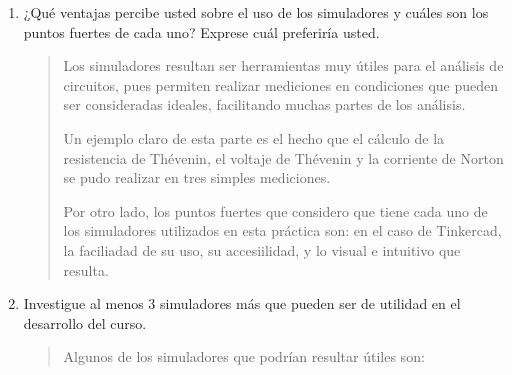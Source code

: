 \documentclass{article}
\begin{document}
\begin{enumerate}[label=\alph*.-]
        \begin{quote}
            Sí, tanto el teorema de Thévenin como el de Norton han quedado comprobados a través de los montajes. Un ejemplo claro de esto es durante el paso 12 y 13, en donde se pudo comprobar la equivalencia de ambos equivalentes para obtener la potencia, obteniendo en ambos casos exactamente el mismo valor, valor muy cercano al valor obtenido durante el paso 12.
        \end{quote}

        \item ¿Qué ventajas percibe usted sobre el uso de los simuladores y cuáles son los puntos fuertes de cada uno? Exprese cuál preferiría usted.
        
        \begin{quote}
            Los simuladores resultan ser herramientas muy útiles para el análisis de circuitos, pues permiten realizar mediciones en condiciones que pueden ser consideradas ideales, facilitando muchas partes de los análisis.

            Un ejemplo claro de esta parte es el hecho que el cálculo de la resistencia de Thévenin, el voltaje de Thévenin y la corriente de Norton se pudo realizar en tres simples mediciones.

            Por otro lado, los puntos fuertes que considero que tiene cada uno de los simuladores utilizados en esta práctica son: en el caso de Tinkercad, la faciliadad de su uso, su accesiilidad, y lo visual e intuitivo que resulta.
        \end{quote}

        \item Investigue al menos 3 simuladores más que pueden ser de utilidad en el desarrollo del curso.
        
        \begin{quote}
            Algunos de los simuladores que podrían resultar útiles son:
            

\end{quote}
\end{enumerate}
\end{document}

